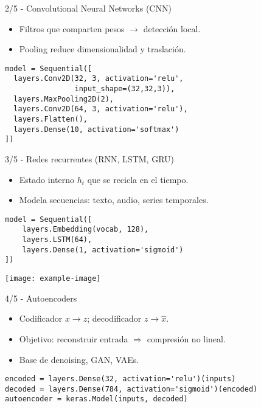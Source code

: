 \documentclass[12pt,spanish]{beamer}
\begin{document}
\begin{frame}{2/5  -  Convolutional Neural Networks (CNN)}
  \begin{itemize}
    \item Filtros que comparten pesos \(\rightarrow\) detección local.
    \item Pooling reduce dimensionalidad y traslación.
  \end{itemize}
  \begin{verbatim}
model = Sequential([
  layers.Conv2D(32, 3, activation='relu',
                input_shape=(32,32,3)),
  layers.MaxPooling2D(2),
  layers.Conv2D(64, 3, activation='relu'),
  layers.Flatten(),
  layers.Dense(10, activation='softmax')
])
  \end{verbatim}
\end{frame}

\begin{frame}{3/5  -  Redes recurrentes (RNN, LSTM, GRU)}
  \begin{itemize}
    \item Estado interno \(h_t\) que se recicla en el tiempo.
    \item Modela secuencias: texto, audio, series temporales.
  \end{itemize}
  \begin{verbatim}
model = Sequential([
    layers.Embedding(vocab, 128),
    layers.LSTM(64),
    layers.Dense(1, activation='sigmoid')
])
  \end{verbatim}
  \centering
  \texttt{[image: example-image]}
\end{frame}

\begin{frame}{4/5  -  Autoencoders}
  \begin{itemize}
    \item Codificador \(x \rightarrow z\); decodificador \(z \rightarrow \hat{x}\).
    \item Objetivo: reconstruir entrada \(\Rightarrow\) compresión no lineal.
    \item Base de denoising, GAN, VAEs.
  \end{itemize}
  \begin{verbatim}
encoded = layers.Dense(32, activation='relu')(inputs)
decoded = layers.Dense(784, activation='sigmoid')(encoded)
autoencoder = keras.Model(inputs, decoded)
  \end{verbatim}
\end{frame}
\end{document}
